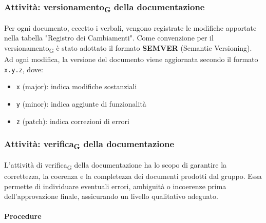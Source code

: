 \documentclass[11pt,a4paper]{article}
\newcommand{\gls}[1]{#1\textsubscript{G}}
\begin{document}
\subsubsection{Attività: \gls{versionamento} della documentazione}

Per ogni documento, eccetto i verbali, vengono registrate le modifiche apportate nella tabella "Registro dei Cambiamenti". 
Come convenzione per il \gls{versionamento} è stato adottato il formato \textbf{SEMVER} (Semantic Versioning). Ad ogni modifica, la versione del documento viene aggiornata secondo il formato \texttt{x.y.z}, dove:
\begin{itemize}
    \item \texttt{x} (major): indica modifiche sostanziali
    \item \texttt{y} (minor): indica aggiunte di funzionalità
    \item \texttt{z} (patch): indica correzioni di errori
\end{itemize}

\subsubsection{Attività: \gls{verifica} della documentazione}

L’attività di \gls{verifica} della documentazione ha lo scopo di garantire la correttezza, la coerenza e la completezza dei documenti prodotti dal gruppo.  
Essa permette di individuare eventuali errori, ambiguità o incoerenze prima dell’approvazione finale, assicurando un livello qualitativo adeguato.

\paragraph{Procedure}
\end{document}
